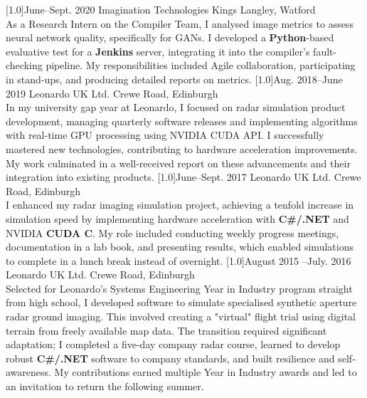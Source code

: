 \documentclass[a4paper]{cv-style}     %
\begin{document}
\begin{entrylist}
{%
}
\entry
  {\scalebox{.8}[1.0]{June--Sept.  2020}}
  {Imagination Technologies}
  {Kings Langley, Watford}
  {\\
As a Research Intern on the Compiler Team, I analysed image metrics to assess neural network quality, specifically for GANs. I developed a \textbf{Python}-based evaluative test for a \textbf{Jenkins} server, integrating it into the compiler's fault-checking pipeline. My responsibilities included Agile collaboration, participating in stand-ups, and producing detailed reports on metrics.
 }
\entry
  {\scalebox{.8}[1.0]{Aug. 2018--June 2019}}
  {Leonardo UK Ltd.}
  {Crewe Road, Edinburgh}
  {\\
  In my university gap year at Leonardo, I focused on radar simulation product development, managing quarterly software releases and implementing algorithms with real-time GPU processing using NVIDIA CUDA API. I successfully mastered new technologies, contributing to hardware acceleration improvements. My work culminated in a well-received report on these advancements and their integration into existing products.
}
\entry
  {\scalebox{.8}[1.0]{June--Sept. 2017}}
  {Leonardo UK Ltd.}
  {Crewe Road, Edinburgh}
  {\\
  I enhanced my radar imaging simulation project, achieving a tenfold increase in simulation speed by implementing hardware acceleration with \textbf{C#/.NET} and NVIDIA \textbf{CUDA C}. My role included conducting weekly progress meetings, documentation in a lab book, and presenting results, which enabled simulations to complete in a lunch break instead of overnight.
}
\entry
  {\scalebox{.8}[1.0]{August 2015 --July.  2016}}
  {Leonardo UK Ltd.}
  {Crewe Road, Edinburgh}
  {\\
 Selected for Leonardo's Systems Engineering Year in Industry program straight from high school, I developed software to simulate specialised synthetic aperture radar ground imaging. This involved creating a "virtual" flight trial using digital terrain from freely available map data. The transition required significant adaptation; I completed a five-day company radar course, learned to develop robust \textbf{C#/.NET} software to company standards, and built resilience and self-awareness. My contributions earned multiple Year in Industry awards and led to an invitation to return the following summer.
}


\end{entrylist}
\end{document}
